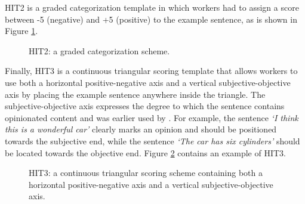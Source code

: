 \documentclass[11pt]{elsarticle}
\begin{document}
HIT2 is a graded categorization template in which workers had to assign a score between -5 (negative) and +5 (positive) to the example sentence, as is shown in Figure \ref{hit2}.

\begin{figure}[ht]
  \begin{center}
\caption{HIT2: a graded categorization scheme.}
\label{hit2}
  \end{center}
\end{figure}



Finally, HIT3 is a continuous triangular scoring template that allows workers to use both a horizontal positive-negative axis and a vertical subjective-objective axis by placing the example sentence anywhere inside the triangle. The subjective-objective axis expresses the degree to which the sentence contains opinionated content and was earlier used by \cite{sentiwordnet:10}. For example, the sentence \textit{`I think this is a wonderful car'} clearly marks an opinion and should be positioned towards the subjective end, while the sentence \textit{`The car has six cylinders'} should be located towards the objective end. Figure \ref{hit3} contains an example of HIT3.

\begin{figure}[ht]
  \begin{center}
\caption{HIT3: a continuous triangular scoring scheme containing both a horizontal positive-negative axis and a vertical subjective-objective axis.}
\label{hit3}
  \end{center}
\end{figure}
\end{document}
